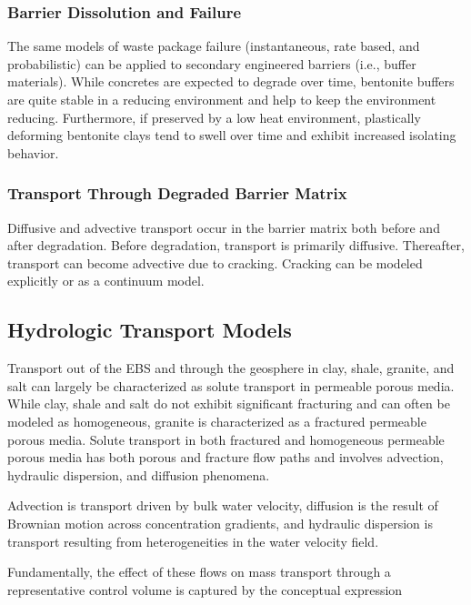 \subsubsection{Barrier Dissolution and Failure}

The same models of waste package failure (instantaneous, rate based, and 
probabilistic) can be applied to secondary engineered barriers (i.e., buffer 
materials). While concretes are expected to 
degrade over time, bentonite buffers are quite stable in a reducing 
environment and help to keep the environment reducing. Furthermore, if 
preserved by a low heat environment, plastically deforming bentonite
clays tend to swell over time and exhibit increased isolating behavior.

\subsubsection{Transport Through Degraded Barrier Matrix}

Diffusive and advective transport occur in the barrier matrix both before and 
after degradation. Before degradation, transport is primarily diffusive. 
Thereafter, transport can become advective due to cracking. Cracking can be 
modeled explicitly or as a continuum model.  



\subsection{Hydrologic Transport Models}

Transport out of the \gls{EBS} and through the geosphere in clay, shale, granite,
and salt can largely be characterized as solute transport in permeable porous 
media. While clay, shale and salt do not exhibit significant fracturing and can 
often be modeled as homogeneous, granite is  characterized as a fractured 
permeable porous media.  Solute transport in both fractured and homogeneous 
permeable porous media has both porous and fracture flow paths and involves
advection, hydraulic dispersion, and diffusion phenomena. 

Advection is transport driven by bulk water velocity, diffusion is the 
result of Brownian motion across concentration gradients, and hydraulic 
dispersion is transport resulting from heterogeneities in the water velocity field. 

Fundamentally, the effect of these flows on mass transport through a 
representative control volume is captured by the 
conceptual expression 

